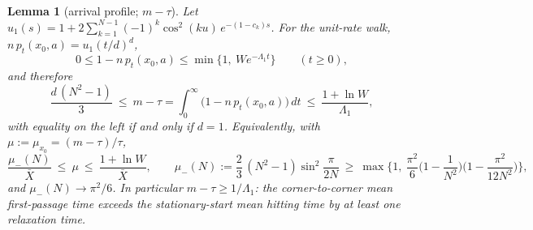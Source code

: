 \documentclass[11pt,a4paper]{article}
\newcommand{\Xb}{\bar X}
\theoremstyle{plain}
\newtheorem{lemma}[theorem]{Lemma}
\theoremstyle{definition}
\numberwithin{equation}{section}
\begin{document}
\begin{lemma}[arrival profile; $m-\tau$]\label{lem:arrival}
Let $u_1(s)=1+2\sum_{k=1}^{N-1}(-1)^k\cos^2(ku)\,e^{-(1-c_k)s}$. For the unit-rate walk, $n\,p_t(x_0,a)=u_1(t/d)^d$,
\begin{equation}\label{eq:profile}
0\le1-n\,p_t(x_0,a)\le\min\big\{1,\ W e^{-\Lambda_1t}\big\}\qquad(t\ge0),
\end{equation}
and therefore
\begin{equation}\label{eq:mtau}
\frac{d\,(N^2-1)}{3}\ \le\ m-\tau=\int_0^\infty\big(1-n\,p_t(x_0,a)\big)\,dt\ \le\ \frac{1+\ln W}{\Lambda_1},
\end{equation}
with equality on the left if and only if $d=1$. Equivalently, with $\mu:=\mu_{x_0}=(m-\tau)/\tau$,
\begin{equation}\label{eq:muminus}
\frac{\mu_-(N)}{\Xb}\ \le\ \mu\ \le\ \frac{1+\ln W}{\Xb},\qquad
\mu_-(N):=\frac23\,(N^2-1)\sin^2\frac{\pi}{2N}\ \ge\ \max\Big\{1,\ \frac{\pi^2}{6}\Big(1-\frac1{N^2}\Big)\Big(1-\frac{\pi^2}{12N^2}\Big)\Big\},
\end{equation}
and $\mu_-(N)\to\pi^2/6$. In particular $m-\tau\ge1/\Lambda_1$: the corner-to-corner mean first-passage time exceeds the stationary-start mean hitting time by at least one relaxation time.
\end{lemma}
\end{document}
